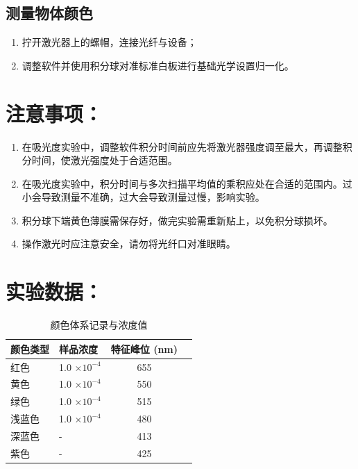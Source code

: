 \subsection{测量物体颜色}
\begin{enumerate}[label=\arabic* 、, leftmargin=4em, labelsep=0pt]
    \item 拧开激光器上的螺帽，连接光纤与设备；
    \item 调整软件并使用积分球对准标准白板进行基础光学设置归一化。
\end{enumerate}

\section{注意事项：}
\begin{enumerate}[label=\arabic* 、, leftmargin=4em, labelsep=0pt]
    \item 在吸光度实验中，调整软件积分时间前应先将激光器强度调至最大，再调整积分时间，使激光强度处于合适范围。
    \item 在吸光度实验中，积分时间与多次扫描平均值的乘积应处在合适的范围内。过小会导致测量不准确，过大会导致测量过慢，影响实验。
    \item 积分球下端黄色薄膜需保存好，做完实验需重新贴上，以免积分球损坏。
    \item 操作激光时应注意安全，请勿将光纤口对准眼睛。
\end{enumerate}

\section{实验数据：}
\begin{table}[htbp]
    \centering
    \caption{颜色体系记录与浓度值}
    \begin{tabular}{llcc}
        \hline
        颜色类型 & 样品浓度 & 特征峰位 (nm) \\
        \hline
        红色 & 1.0 $\times 10^{-4}$ & 655 \\
        黄色 & 1.0 $\times 10^{-4}$ & 550 \\
        绿色 & 1.0 $\times 10^{-4}$ & 515 \\
        浅蓝色 & 1.0 $\times 10^{-4}$ & 480 \\
        深蓝色 & - & 413 \\
        紫色 & - & 425 \\
        \hline
    \end{tabular}
\end{table}

